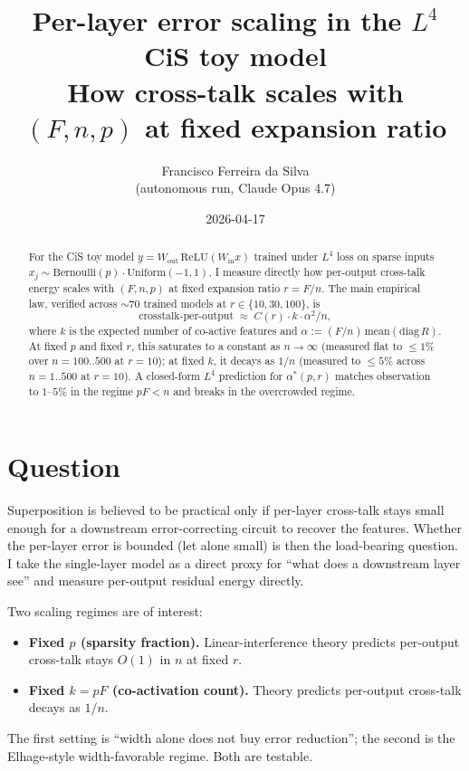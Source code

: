 \documentclass[11pt]{article}
\title{Per-layer error scaling in the $L^4$ CiS toy model\\
\large How cross-talk scales with $(F, n, p)$ at fixed expansion ratio}
\author{Francisco Ferreira da Silva\\{\small (autonomous run, Claude Opus 4.7)}}
\date{2026-04-17}
\newcommand{\Win}{W_{\mathrm{in}}}
\newcommand{\Wout}{W_{\mathrm{out}}}
\begin{document}
\maketitle

\begin{abstract}
\noindent
For the CiS toy model $y = \Wout\,\mathrm{ReLU}(\Win x)$ trained under $L^4$
loss on sparse inputs $x_j \sim \mathrm{Bernoulli}(p)\cdot\mathrm{Uniform}(-1,1)$,
I measure directly how per-output cross-talk energy scales with
$(F, n, p)$ at fixed expansion ratio $r = F/n$. The main empirical law,
verified across $\sim 70$ trained models at $r \in \{10, 30, 100\}$, is
$$\text{crosstalk-per-output} \;\approx\; C(r)\cdot k\cdot\alpha^2/n,$$
where $k$ is the expected number of co-active features and
$\alpha := (F/n)\,\mathrm{mean}(\mathrm{diag}\,R)$. At fixed $p$ and fixed
$r$, this saturates to a constant as $n\to\infty$ (measured flat to
$\le 1\%$ over $n{=}100..500$ at $r{=}10$); at fixed $k$, it decays as
$1/n$ (measured to $\le 5\%$ across $n{=}1..500$ at $r{=}10$). A
closed-form $L^4$ prediction for $\alpha^*(p, r)$ matches observation to
$1$--$5\%$ in the regime $pF < n$ and breaks in the overcrowded regime.
\end{abstract}

\section{Question}

Superposition is believed to be practical only if per-layer cross-talk
stays small enough for a downstream error-correcting circuit to recover
the features. Whether the per-layer error is bounded (let alone small)
is then the load-bearing question. I take the single-layer model as a
direct proxy for ``what does a downstream layer see'' and measure
per-output residual energy directly.

Two scaling regimes are of interest:
\begin{itemize}
  \item \textbf{Fixed $p$ (sparsity fraction).} Linear-interference
  theory predicts per-output cross-talk stays $O(1)$ in $n$ at fixed $r$.
  \item \textbf{Fixed $k = pF$ (co-activation count).} Theory predicts
  per-output cross-talk decays as $1/n$.
\end{itemize}
The first setting is ``width alone does not buy error reduction''; the
second is the Elhage-style width-favorable regime. Both are testable.
\end{document}
